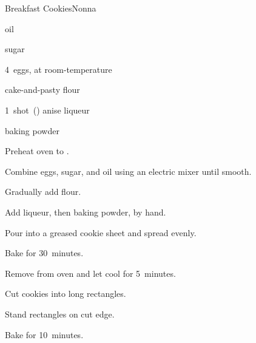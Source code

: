 \begin{recipe}{Breakfast Cookies}{Nonna}{}

\begin{ingredients}
\item {} oil
\item {} sugar
\item 4~eggs, at room-temperature
\item {} cake-and-pasty flour
\item 1~shot~(\oz{1\half}) anise liqueur
\item {} baking powder
\end{ingredients}

\begin{directions}
\item Preheat oven to .
\item Combine eggs, sugar, and oil using an electric mixer until smooth.
\item Gradually add flour.
\item Add liqueur, then baking powder, by hand.
\item Pour into a greased cookie sheet and spread evenly.
\item Bake for 30~minutes.
\item Remove from oven and let cool for 5~minutes.
\item Cut cookies into long rectangles.
\item Stand rectangles on cut edge.
\item Bake for 10~minutes.
\end{directions}

\end{recipe}
